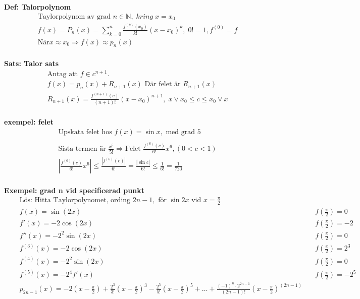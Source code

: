 \documentclass{article}
\begin{document}
\textbf{Def: Talorpolynom}
\begin{align*}
  &\quad  \text{Taylorpolynom av grad } n \in \mathbb{N}, \; kring \; x=x_0 \\
  &\quad  f(x)=P_n(x)= \displaystyle\sum_{k=0}^{n}\frac{f^{(k)}(x_0)}{k!}{(x-x_0)}^k, \; 0!=1,f^{(0)}=f \\
  &\quad  \text{När} x \approx x_0 \Rightarrow f(x) \approx p_n(x) \\
\end{align*}

\textbf{Sats: Talor sats}
\begin{align*}
  &\quad  \text{Antag att $f\in c^{n+1}$.} \\
  &\quad  f(x)=p_n(x)+R_{n+1}(x) \text{ Där felet är } R_{n+1}(x) \\
  &\quad  R_{n+1}(x)=\frac{f^{(n+1)}(c)}{(n+1)!}{(x-x_0)}^{n+1}, \; x \lor x_0 \leq c \leq x_0 \lor x \\
\end{align*}

\textbf{exempel: felet}
\begin{align*}
  &\quad  \text{Upskata felet hos } f(x)=\sin{x}, \text{ med grad } 5 \\
  &\quad  \\
  &\quad  \text{Sista termen är } \frac{x^5}{5!} \Rightarrow \text{Felet } \frac{f^{(6)}(c)}{6!}x^6, (0<c<1) \\
  &\quad  |\frac{f^{(6)}(c)}{6!}x^6| \leq \frac{|f^{(6)}(c)|}{6!} = \frac{|\sin{c}|}{6!}
  \leq \frac{1}{6!} = \frac{1}{720} \\
\end{align*}


\textbf{Exempel: grad n vid specificerad punkt}
\begin{align*}
  &\quad  \text{Lös: Hitta Taylorpolynomet, ording } 2n-1, \text{ för } \sin{2x} \text{ vid } x=\frac{\pi}{2} \\
  &\quad  f(x)=\sin(2x)          &\quad f(\frac{\pi}{2})=0   \\
  &\quad  f'(x)=-2\cos(2x)       &\quad f(\frac{\pi}{2})=-2  \\
  &\quad  f''(x)=-2^2\sin(2x)    &\quad f(\frac{\pi}{2})=0   \\
  &\quad  f^{(3)}(x)=-2\cos(2x)   &\quad f(\frac{\pi}{2})=2^3 \\
  &\quad  f^{(4)}(x)=-2^2\sin(2x) &\quad f(\frac{\pi}{2})=0   \\
  &\quad  f^{(5)}(x)=-2^4f'(x)    &\quad f(\frac{\pi}{2})=-2^5 \\
  &\quad  p_{2n-1}(x)=-2(x-\frac{\pi}{2}) + \frac{2^3}{3!}{(x-\frac{\pi}{2})}^3 -
  \frac{2^5}{5!}{(x-\frac{\pi}{2})}^5+\ldots+\frac{{(-1)}^n\cdot2^{2n-1}}{(2n-1)!}{(x-\frac{\pi}{2})}^{(2n-1)} \\
\end{align*}
\end{document}
